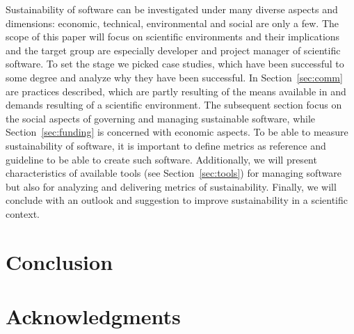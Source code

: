 \documentclass[11pt, oneside]{amsart}
\begin{document}
Sustainability of software can be investigated under many diverse aspects and dimensions: 
economic, technical, environmental and social are only a few. The scope of this paper will focus 
on scientific environments and their implications and the target group are especially developer 
and project manager of scientific software. To set the stage we picked case studies, which have been 
successful to some degree and analyze why they have been successful. In Section~\ref{sec:comm} are 
practices described, which are partly resulting of the means available in and demands resulting of a scientific environment. 
The subsequent section focus on the social aspects of governing and managing sustainable software, 
while Section~\ref{sec:funding} is concerned with economic aspects. To be able to measure sustainability of 
software, it is important to define metrics as reference and guideline to be able to create such 
software. Additionally, we will present characteristics of available tools (see Section~\ref{sec:tools}) 
for managing software but also for analyzing and delivering metrics of sustainability. Finally, 
we will conclude with an outlook and suggestion to improve sustainability in a scientific context.  










\section{Conclusion} \label{sec:conclusion}

\section*{Acknowledgments} \label{sec:acks}






\end{document}
